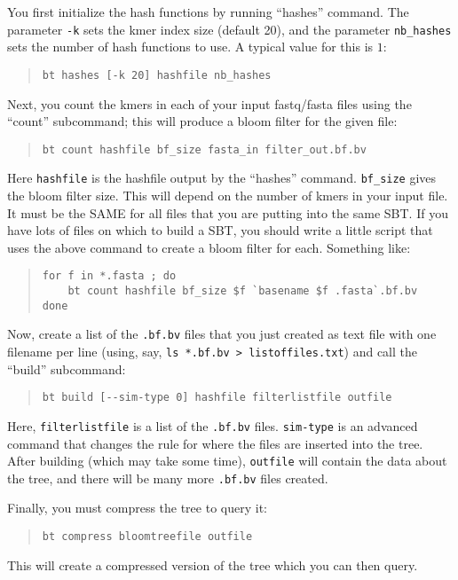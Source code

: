 \documentclass{article}
\begin{document}
You first initialize the hash functions by running ``hashes'' command. The parameter \verb+-k+ sets the kmer index size (default 20), and the parameter \verb+nb_hashes+ sets the number of hash functions to use. A typical value for this is $1$:
%
\begin{quote}
\begin{verbatim}
bt hashes [-k 20] hashfile nb_hashes
\end{verbatim}
\end{quote}

Next, you count the kmers in each of your input fastq/fasta files using the ``count'' subcommand; this will produce a bloom filter for the given file:
%
\begin{quote}
\begin{verbatim}
bt count hashfile bf_size fasta_in filter_out.bf.bv
\end{verbatim}
\end{quote}
%
Here \verb+hashfile+ is the hashfile output by the ``hashes'' command. \verb+bf_size+ gives the bloom filter size. This will depend on the number of kmers in your input file. It must be the SAME for all files that you are putting into the same SBT. If you have lots of files on which to build a SBT, you should write a little script that uses the above command to create a bloom filter for each. Something like:
%
\begin{quote}
\begin{verbatim}
for f in *.fasta ; do 
    bt count hashfile bf_size $f `basename $f .fasta`.bf.bv
done
\end{verbatim}
\end{quote}

Now, create a list of the \verb+.bf.bv+ files that you just created as text file with one filename per line (using, say, \verb+ls *.bf.bv > listoffiles.txt+) and call the ``build'' subcommand:
\begin{quote}
\begin{verbatim}
bt build [--sim-type 0] hashfile filterlistfile outfile
\end{verbatim}
\end{quote}
Here, \verb+filterlistfile+ is a list of the \verb+.bf.bv+ files. \verb+sim-type+ is an advanced command that changes the rule for where the files are inserted into the tree. After building (which may take some time), \verb+outfile+ will contain the data about the tree, and there will be many more \verb+.bf.bv+ files created. 

Finally, you must compress the tree to query it:
\begin{quote}
\begin{verbatim}
bt compress bloomtreefile outfile
\end{verbatim}
\end{quote}
This will create a compressed version of the tree which you can then query.
\end{document}
